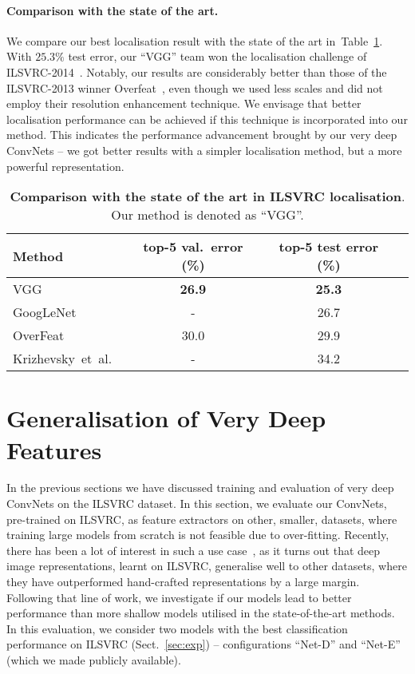 \documentclass{article} %
\makeatletter
\newcommand{\tblref}[1]{Table~\ref{#1}}
\newcommand{\sref}[1]{Sect.~\ref{#1}}
\newcommand*{\etal}{et~al.\@\xspace}
\makeatother
\begin{document}
\paragraph{Comparison with the state of the art.}

We compare our best localisation result with the state of the art in~\tblref{tab:loc_SOA}.
With $25.3\%$ test error, our ``VGG'' team won the localisation challenge of ILSVRC-2014~\citep{Russakovsky14}.
Notably, our results are considerably better than those of the ILSVRC-2013 winner Overfeat~\citep{Sermanet14}, even though we used less scales and did not employ
their resolution enhancement technique. 
We envisage that better localisation performance can be achieved if this technique is incorporated into our method.
This indicates the performance advancement brought by our very deep ConvNets -- we got better results with a simpler localisation method, but a more powerful representation.

\begin{table}[htb]
\setlength{\tabcolsep}{2pt}
\small
\centering
\caption{\textbf{Comparison with the state of the art in ILSVRC localisation}. Our method is denoted as ``VGG''.
}
\begin{tabular}{|l|c|c|c|} \hline
Method & top-5 val.\ error (\%) & top-5 test error (\%) \\ \hline
VGG & \textbf{26.9} & \textbf{25.3} \\ \hline
GoogLeNet~\citep{Szegedy14} & - & 26.7 \\ \hline
OverFeat~\citep{Sermanet14} & 30.0 & 29.9 \\ \hline
Krizhevsky~\etal~\citep{Krizhevsky12} & - & 34.2 \\ \hline
\end{tabular}
\label{tab:loc_SOA}
\end{table}

\section{Generalisation of Very Deep Features}
\label{sec:dataset_transfer}
In the previous sections we have discussed training and evaluation of very deep ConvNets on the ILSVRC dataset. In this section, we evaluate our ConvNets, pre-trained on ILSVRC, as feature extractors on other, smaller, datasets, where training large models from scratch is not feasible due to over-fitting. Recently, there has been a lot of interest in such a use case~\citep{Zeiler13,Donahue13,Razavian14,Chatfield14}, as it turns out that deep image representations, learnt on ILSVRC, generalise well to other datasets, where they have outperformed hand-crafted representations by a large margin. Following that line of work, we investigate if our models lead to better performance than more shallow models utilised in the state-of-the-art methods.
In this evaluation, we consider two models with the best classification performance on ILSVRC (\sref{sec:exp}) -- configurations ``Net-D'' and ``Net-E'' (which we made publicly available).
\end{document}
